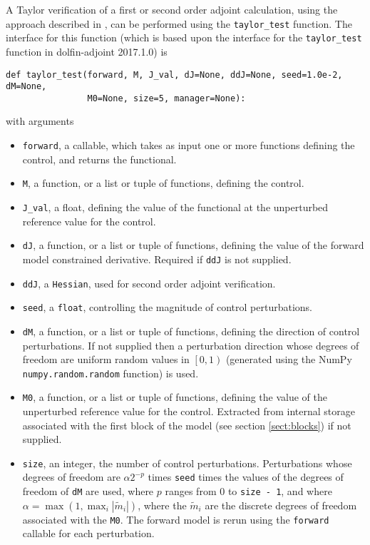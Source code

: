 \documentclass[11pt]{article}
\begin{document}
A Taylor verification of a first or second order adjoint calculation, using the
approach described in \citet{farrell2013}, can be performed using the
\texttt{taylor\_test} function. The interface for this function (which is based
upon the interface for the \texttt{taylor\_test} function in dolfin-adjoint
2017.1.0) is
\begin{lstlisting}
def taylor_test(forward, M, J_val, dJ=None, ddJ=None, seed=1.0e-2, dM=None,
                M0=None, size=5, manager=None):
\end{lstlisting}
with arguments
\begin{itemize}
  \item \texttt{forward}, a callable, which takes as input one or more
    functions defining the control, and returns the functional.
  \item \texttt{M}, a function, or a list or tuple of functions, defining the
    control.
  \item \texttt{J\_val}, a float, defining the value of the functional at the
    unperturbed reference value for the control.
  \item \texttt{dJ}, a function, or a list or tuple of functions, defining the
    value of the forward model constrained derivative. Required if \texttt{ddJ}
    is not supplied.
  \item \texttt{ddJ}, a \texttt{Hessian}, used for second order adjoint
    verification.
  \item \texttt{seed}, a \texttt{float}, controlling the magnitude of control
    perturbations.
  \item \texttt{dM}, a function, or a list or tuple of functions, defining the
    direction of control perturbations. If not supplied then a perturbation
    direction whose degrees of freedom are uniform random values in $\left[ 0,
    1 \right)$ (generated using the NumPy \texttt{numpy.random.random}
    function) is used.
  \item \texttt{M0}, a function, or a list or tuple of functions, defining the
    value of the unperturbed reference value for the control. Extracted from
    internal storage associated with the first block of the model (see section
    \ref{sect:blocks}) if not supplied.
  \item \texttt{size}, an integer, the number of control perturbations.
    Perturbations whose degrees of freedom are $\alpha 2^{-p}$ times
    \texttt{seed} times the values of the degrees of freedom of \texttt{dM} are
    used, where $p$ ranges from $0$ to \texttt{size - 1}, and where $\alpha =
    \max \left( 1, \max_i \left| \tilde{m}_i \right| \right)$, where the
    $\tilde{m}_i$ are the discrete degrees of freedom associated with the
    \texttt{M0}. The forward model is rerun using the \texttt{forward} callable
    for each perturbation.
\end{itemize}
\end{document}
